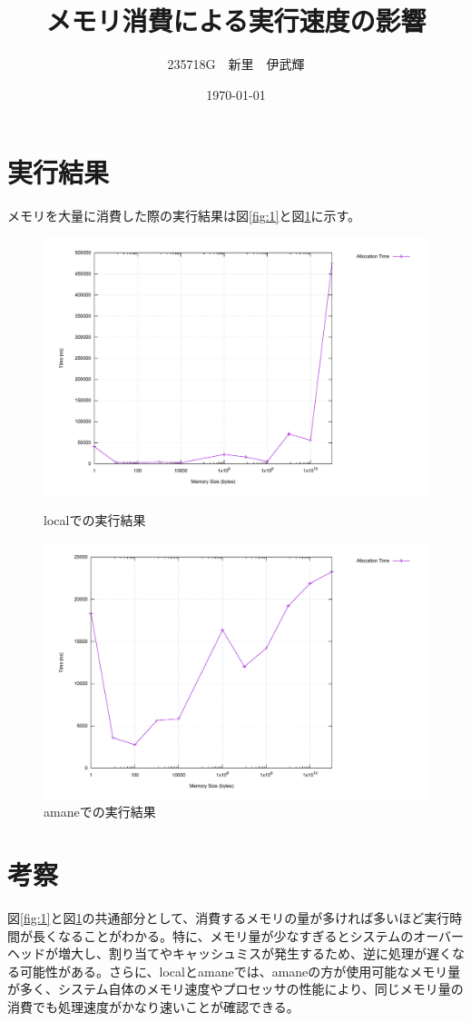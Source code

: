 \documentclass[a4paper, 11pt, titlepage]{jsarticle}
\title{メモリ消費による実行速度の影響}
\author{235718G　新里　伊武輝 }
\date{\today}
\begin{document}
\maketitle

\clearpage

\section{実行結果}
メモリを大量に消費した際の実行結果は図\ref{fig:1}と図\ref{fig:2}に示す。

\begin{figure}[htbp]
    \centering
    \begin{minipage}{0.45\textwidth}
        \centering
        \includegraphics[width=\linewidth]{../img/malloc_plot_macos.pdf}
        \caption{localでの実行結果}
        \label{fig:1}
    \end{minipage}
    \hfill
    \begin{minipage}{0.45\textwidth}
        \centering
        \includegraphics[width=\linewidth]{../img/malloc_plot_linux.pdf}
        \caption{amaneでの実行結果}
        \label{fig:2}
    \end{minipage}
\end{figure}


\section{考察}
図\ref{fig:1}と図\ref{fig:2}の共通部分として、消費するメモリの量が多ければ多いほど実行時間が長くなることがわかる。特に、メモリ量が少なすぎるとシステムのオーバーヘッドが増大し、割り当てやキャッシュミスが発生するため、逆に処理が遅くなる可能性がある。さらに、localとamaneでは、amaneの方が使用可能なメモリ量が多く、システム自体のメモリ速度やプロセッサの性能により、同じメモリ量の消費でも処理速度がかなり速いことが確認できる。
\end{document}
